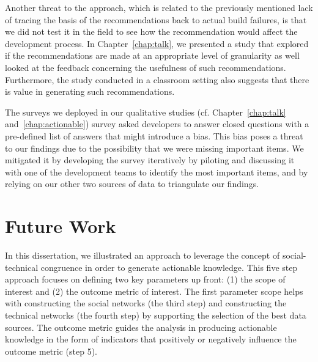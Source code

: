 
Another threat to the approach, which is related to the previously mentioned lack of tracing the basis of the recommendations back to actual build failures, is that we did not test it in the field to see how the recommendation would affect the development process.
In Chapter~\ref{chap:talk}, we presented a study that explored if the recommendations are made at an appropriate level of granularity as well looked at the feedback concerning the usefulness of such recommendations.
Furthermore, the study conducted in a classroom setting also suggests that there is value in generating such recommendations.

The surveys we deployed in our qualitative studies (cf. Chapter~\ref{chap:talk} and~\ref{chap:actionable}) survey asked developers to answer closed questions with a pre-defined list of answers that might introduce a bias.
This bias poses a threat to our findings due to the possibility that we were missing important items.
We mitigated it by developing the survey iteratively by piloting and discussing it with one of the development teams to identify the most important items, and by relying on our other two sources of data to triangulate our findings.











\section{Future Work}
\label{ch:dis:con}
In this dissertation, we illustrated an approach to leverage the concept of social-technical congruence in order to generate actionable knowledge.
This five step approach focuses on defining two key parameters up front: (1) the scope of interest and (2) the outcome metric of interest.
The first parameter scope helps with constructing the social networks (the third step) and constructing the technical networks (the fourth step) by supporting the selection of the best data sources.
The outcome metric guides the analysis in producing actionable knowledge in the form of indicators that positively or negatively influence the outcome metric (step 5). 

